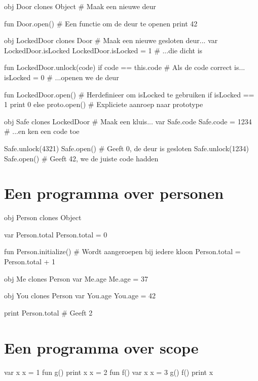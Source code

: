 \begin{program}
obj Door clones Object       # Maak een nieuwe deur

fun Door.open()              # Een functie om de deur te openen
    print 42

obj LockedDoor clones Door   # Maak een nieuwe gesloten deur...
var LockedDoor.isLocked
LockedDoor.isLocked = 1      # ...die dicht is

fun LockedDoor.unlock(code)
    if code == this.code     # Als de code correct is...
        isLocked = 0         # ...openen we de deur

fun LockedDoor.open()        # Herdefinieer om isLocked te gebruiken
    if isLocked == 1
        print 0
    else
        proto.open()         # Expliciete aanroep naar prototype

obj Safe clones LockedDoor   # Maak een kluis...
var Safe.code
Safe.code = 1234             # ...en ken een code toe

Safe.unlock(4321)
Safe.open()                  # Geeft 0, de deur is gesloten
Safe.unlock(1234)
Safe.open()                  # Geeft 42, we de juiste code hadden
\end{program}

\section{Een programma over personen}

\begin{program}
obj Person clones Object

var Person.total
Person.total = 0

fun Person.initialize()      # Wordt aangeroepen bij iedere kloon
    Person.total = Person.total + 1

obj Me clones Person
var Me.age
Me.age = 37

obj You clones Person
var You.age
You.age = 42

print Person.total           # Geeft 2
\end{program}

\section{Een programma over scope}

\begin{program}
var x
x = 1
fun g()
    print x
    x = 2
fun f()
    var x
    x = 3
    g()
f()
print x
\end{program}

